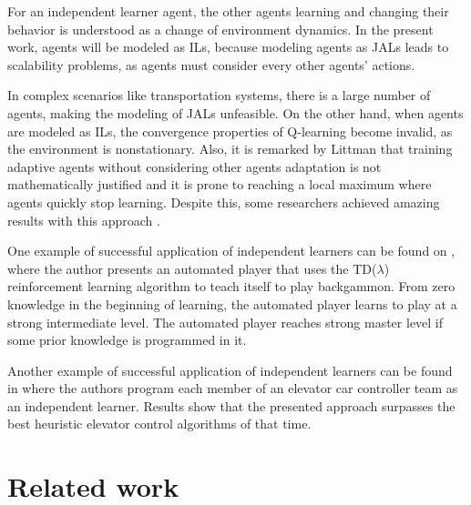 \documentclass{RITA}
\begin{document}
For an independent learner agent, the other agents learning and changing their behavior is understood as a change of environment dynamics. In the present work, agents will be modeled as ILs, because modeling agents as JALs leads to scalability problems, as agents must consider every other agents' actions. 

In complex scenarios like transportation systems, there is a large number of agents, making the modeling of JALs unfeasible. On the other hand, when agents are modeled as ILs, the convergence properties of Q-learning become invalid, as the environment is nonstationary. Also, it is remarked by Littman \cite{Littman1994} that training adaptive agents without considering other agents adaptation is not mathematically justified and it is prone to reaching a local maximum where agents quickly stop learning. Despite this, some researchers achieved amazing results with this approach \cite{Littman1994}.

One example of successful application of independent learners can be found on \cite{Tesauro1994}, where the author presents an automated player that uses the TD($\lambda$) reinforcement learning algorithm \cite{Sutton1988} to teach itself to play backgammon. From zero knowledge in the beginning of learning, the automated player learns to play at a strong intermediate level. The automated player reaches strong master level if some prior knowledge is programmed in it. 

Another example of successful application of independent learners can be found in \cite{Crites&Barto1998} where the authors program each member of an elevator car controller team as an independent learner. Results show that the presented approach surpasses the best heuristic elevator control algorithms of that time.




\section{Related work}
\label{sec:related}

\end{document}
